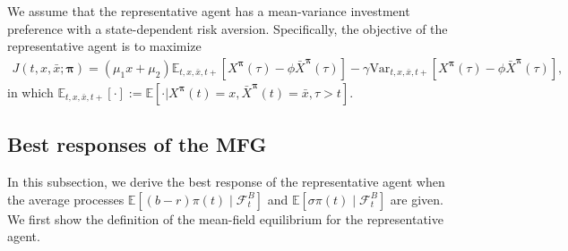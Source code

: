 \documentclass[11pt]{article}
\numberwithin{equation}{section}
\newcommand{\bpi}{\boldsymbol{\pi}}
\begin{document}
We assume that the representative agent has a mean-variance investment preference with a state-dependent risk aversion. Specifically, the objective of the representative agent is to  maximize
		\begin{align}	\label{eq:MMFMFJ}
			J(t, x, \bar{x}; {\bm{\pi}}) = (\mu_1 x+\mu_2)\mathbb{E}_{t,x,\bar{x},t+}[X^{\bpi}(\tau)-\phi\bar{X}^{\bpi}(\tau)]-\gamma \text{Var}_{t,x,\bar{x},t+}[X^{\bpi}(\tau)-\phi\bar{X}^{\bpi}(\tau)],
		\end{align}
		in which \(\mathbb{E}_{t,x,\bar{x},t+}[\cdot]:=\mathbb{E}[\cdot|{X}^{\bpi}(t)={x}, \bar{X}^{\bpi}(t)=\bar{x}, \tau > t]\).
		
		
\subsection{Best responses of the MFG}\label{subsec:MBR}
		In this subsection, we derive the best response of the representative agent when the average processes $\mathbb{E}[(b-r)\pi(t)\mid\mathcal{F}_t^B]$ and $\mathbb{E}[\sigma\pi(t)\mid\mathcal{F}_t^B]$ are given. We first show the definition of the mean-field equilibrium for the representative agent.
		
\end{document}
